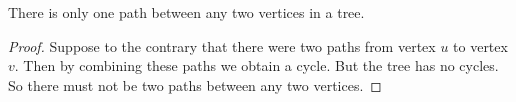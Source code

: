 \begin{prop}

There is only one path between any two vertices in a tree.

\begin{proof}

Suppose to the contrary that there were two paths from vertex $u$ to vertex $v$.
Then by combining these paths we obtain a cycle.
But the tree has no cycles.
So there must not be two paths between any two vertices.
\end{proof}

\end{prop}
\strats
